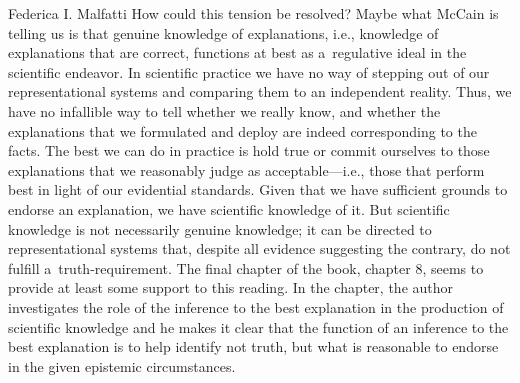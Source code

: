 \begin{recengenv}{Federica I. Malfatti}
How could this tension be resolved? Maybe what McCain is telling us is that genuine knowledge of explanations, i.e., knowledge of explanations that are correct, functions at best as a~regulative ideal in the scientific endeavor. In scientific practice we have no way of stepping out of our representational systems and comparing them to an independent reality. Thus, we have no infallible way to tell whether we really know, and whether the explanations that we formulated and deploy are indeed corresponding to the facts. The best we can do in practice is hold true or commit ourselves to those explanations that we reasonably judge as acceptable---i.e., those that perform best in light of our evidential standards. Given that we have sufficient grounds to endorse an explanation, we have scientific knowledge of it. But scientific knowledge is not necessarily genuine knowledge; it can be directed to representational systems that, despite all evidence suggesting the contrary, do not fulfill a~truth-requirement. The final chapter of the book, chapter 8, seems to provide at least some support to this reading. In the chapter, the author investigates the role of the inference to the best explanation in the production of scientific knowledge and he makes it clear that the function of an inference to the best explanation is to help identify not truth, but what is reasonable to endorse in the given epistemic circumstances.


\end{recengenv}

